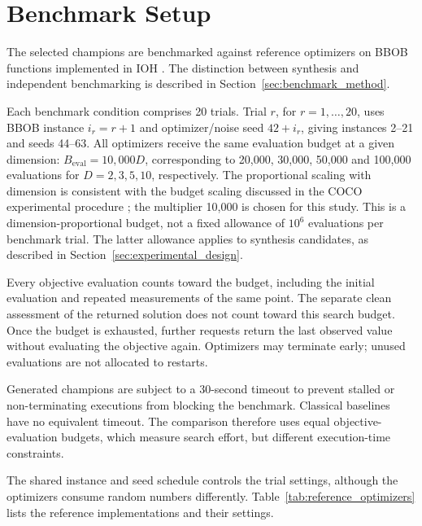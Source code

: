 \FloatBarrier

\section{Benchmark Setup}
\label{sec:independent_benchmark}

The selected champions are benchmarked against reference optimizers on
BBOB functions implemented in IOH \cite{deNobel2024,Hansen2021COCO}.
The distinction between synthesis and independent benchmarking is
described in Section~\ref{sec:benchmark_method}.

Each benchmark condition comprises 20 trials. Trial $r$, for
$r=1,\ldots,20$, uses BBOB instance $i_r=r+1$ and optimizer/noise
seed $42+i_r$, giving instances 2--21 and seeds 44--63. All optimizers
receive the same evaluation budget at a given dimension:
$B_{\mathrm{eval}}=10{,}000D$, corresponding to 20,000, 30,000,
50,000 and 100,000 evaluations for $D=2,3,5,10$, respectively.
The proportional scaling with dimension is consistent with the budget
scaling discussed in the COCO experimental procedure
\cite{Hansen2016Procedure}; the multiplier 10,000 is chosen for this
study. This is a dimension-proportional budget, not a fixed allowance
of $10^6$ evaluations per benchmark trial. The latter allowance applies
to synthesis candidates, as described in
Section~\ref{sec:experimental_design}.

Every objective evaluation counts toward the budget, including the
initial evaluation and repeated measurements of the same point.
The separate clean assessment of the returned solution does not count
toward this search budget. Once the budget is exhausted, further
requests return the last observed value without evaluating the
objective again. Optimizers may terminate early; unused evaluations
are not allocated to restarts.

Generated champions are subject to a 30-second timeout to prevent
stalled or non-terminating executions from blocking the benchmark.
Classical baselines have no equivalent timeout. The comparison therefore
uses equal objective-evaluation budgets, which measure search effort,
but different execution-time constraints.

The shared instance and seed schedule controls the trial settings,
although the optimizers consume random numbers differently.
Table~\ref{tab:reference_optimizers} lists the reference implementations
and their settings.

